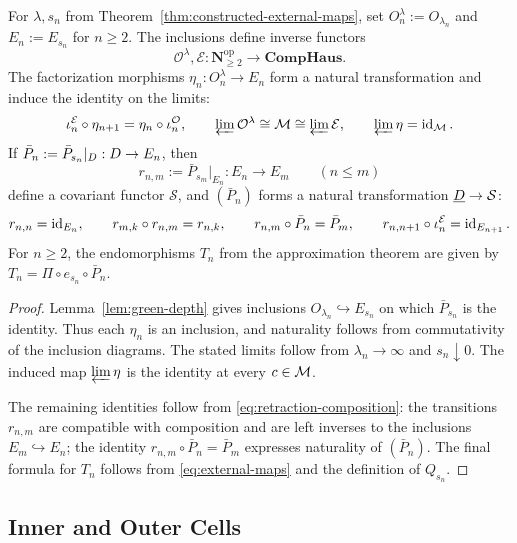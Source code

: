 \begin{proposition}
\label{prop:inverse-system-comparison}
For \(\lambda,s_n\) from Theorem~\ref{thm:constructed-external-maps},
set \(O_n^\lambda:=O_{\lambda_n}\) and \(E_n:=E_{s_n}\) for \(n\ge2\).
The inclusions define inverse functors
\[
 \mathcal O^\lambda,\mathcal E:
 \mathbf N_{\ge2}^{\mathrm{op}}\longrightarrow\mathbf{CompHaus}.
\]
The factorization morphisms \(\eta_n:O_n^\lambda\to E_n\) form a
natural transformation and induce the identity on the limits:
\[
 \iota_n^{\mathcal E}\circ\eta_{n+1}
       =\eta_n\circ\iota_n^{\mathcal O},\qquad
 \varprojlim\mathcal O^\lambda\cong\mathcal M
       \cong\varprojlim\mathcal E,\qquad
 \varprojlim\eta=\operatorname{id}_\mathcal M.
\]
If \(\bar P_n:=\bar P_{s_n}|_{D}:D\to E_n\), then
\[
 r_{n,m}:=\bar P_{s_m}|_{E_n}:E_n\to E_m\qquad(n\le m)
 \]
 define a covariant functor \(\mathcal S\), and \((\bar P_n)\) forms a
 natural transformation \(\underline{D}\to\mathcal S\):
\[
 r_{n,n}=\operatorname{id}_{E_n},\qquad
 r_{m,k}\circ r_{n,m}=r_{n,k},\qquad
 r_{n,m}\circ\bar P_n=\bar P_m,\qquad
 r_{n,n+1}\circ\iota_n^{\mathcal E}=\operatorname{id}_{E_{n+1}}.
\]
For \(n\ge2\), the endomorphisms \(T_n\) from the approximation theorem
are given by
\(T_n=\Pi\circ e_{s_n}\circ\bar P_n\).
\end{proposition}
\begin{proof}
Lemma~\ref{lem:green-depth} gives inclusions
\(O_{\lambda_n}\hookrightarrow E_{s_n}\) on which \(\bar P_{s_n}\) is
the identity. Thus each \(\eta_n\) is an inclusion, and naturality
follows from commutativity of the inclusion diagrams. The stated limits
follow from \(\lambda_n\to\infty\) and \(s_n\downarrow0\). The induced
map \(\varprojlim\eta\) is the identity at every \(c\in\mathcal M\).

The remaining identities follow from
\eqref{eq:retraction-composition}: the transitions \(r_{n,m}\) are
compatible with composition and are left inverses to the inclusions
\(E_m\hookrightarrow E_n\); the identity
\(r_{n,m}\circ\bar P_n=\bar P_m\) expresses naturality of
\((\bar P_n)\). The final formula for \(T_n\) follows from
\eqref{eq:external-maps} and the definition of \(Q_{s_n}\).
\end{proof}

\subsection{Inner and Outer Cells}


